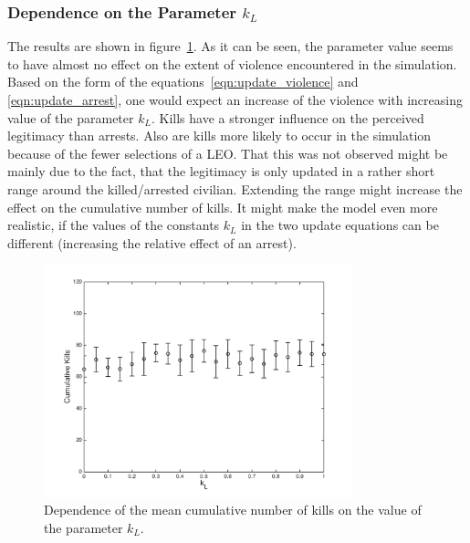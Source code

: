 \documentclass[11pt]{article}
\begin{document}
\subsubsection{Dependence on the Parameter $k_L$}
The results are shown in figure~\ref{fig:k_L_dep}. As it can be seen, the parameter value seems to have almost no effect on the extent of violence encountered in the simulation. Based on the form of the equations~\eqref{eqn:update_violence} and \eqref{eqn:update_arrest}, one would expect an increase of the violence with increasing value of the parameter $k_L$. Kills have a stronger influence on the perceived legitimacy than arrests. Also are kills more likely to occur in the simulation because of the fewer selections of a LEO. That this was not observed might be mainly due to the fact, that the legitimacy is only updated in a rather short range around the killed/arrested civilian. Extending the range might increase the effect on the cumulative number of kills. It might make the model even more realistic, if the values of the constants $k_L$ in the two update equations can be different (increasing the relative effect of an arrest).
\begin{figure}[!htbp]
	\centering
		\includegraphics[width=0.80\textwidth]{../../code/modified_model/k_L_dep.png}
	\caption{Dependence of the mean cumulative number of kills on the value of the parameter $k_L$.}
	\label{fig:k_L_dep}
\end{figure}
\end{document}
